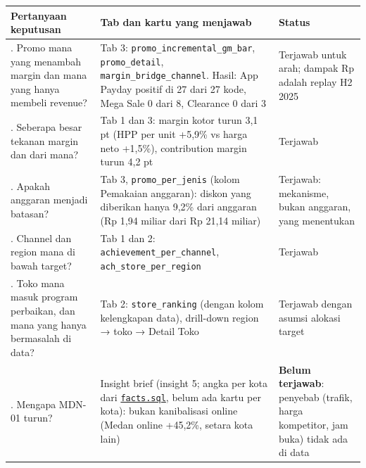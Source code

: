 \documentclass[10pt,a4paper]{article}
\begin{document}
{\def\LTcaptype{none} %
\begin{longtable}[]{@{}
  >{\raggedright\arraybackslash}p{}
  >{\raggedright\arraybackslash}p{}
  >{\raggedright\arraybackslash}p{}@{}}
\toprule\noalign{}
\begin{minipage}[b]{\linewidth}\raggedright
Pertanyaan keputusan
\end{minipage} & \begin{minipage}[b]{\linewidth}\raggedright
Tab dan kartu yang menjawab
\end{minipage} & \begin{minipage}[b]{\linewidth}\raggedright
Status
\end{minipage} \\
\midrule\noalign{}
\endhead
\bottomrule\noalign{}
\endlastfoot
1. Promo mana yang menambah margin dan mana yang hanya membeli revenue? & Tab 3: \texttt{promo\_\allowbreak{}incremental\_\allowbreak{}gm\_\allowbreak{}bar}, \texttt{promo\_\allowbreak{}detail}, \texttt{margin\_\allowbreak{}bridge\_\allowbreak{}channel}. Hasil: App Payday positif di 27 dari 27 kode, Mega Sale 0 dari 8, Clearance 0 dari 3 & Terjawab untuk arah; dampak Rp adalah replay H2 2025 \\
1. Seberapa besar tekanan margin dan dari mana? & Tab 1 dan 3: margin kotor turun 3,1 pt (HPP per unit +5,9\% vs harga neto +1,5\%), contribution margin turun 4,2 pt & Terjawab \\
1. Apakah anggaran menjadi batasan? & Tab 3, \texttt{promo\_\allowbreak{}per\_\allowbreak{}jenis} (kolom Pemakaian anggaran): diskon yang diberikan hanya 9,2\% dari anggaran (Rp 1,94 miliar dari Rp 21,14 miliar) & Terjawab: mekanisme, bukan anggaran, yang menentukan \\
2. Channel dan region mana di bawah target? & Tab 1 dan 2: \texttt{achievement\_\allowbreak{}per\_\allowbreak{}channel}, \texttt{ach\_\allowbreak{}store\_\allowbreak{}per\_\allowbreak{}region} & Terjawab \\
2. Toko mana masuk program perbaikan, dan mana yang hanya bermasalah di data? & Tab 2: \texttt{store\_\allowbreak{}ranking} (dengan kolom kelengkapan data), drill-down region → toko → Detail Toko & Terjawab dengan asumsi alokasi target \\
2. Mengapa MDN-01 turun? & Insight brief (insight 5; angka per kota dari \href{https://github.com/titan2903/kirana-omnichannel-performance-intelligence/blob/master/reports/insights/facts.sql}{\texttt{facts.sql}}, belum ada kartu per kota): bukan kanibalisasi online (Medan online +45,2\%, setara kota lain) & \textbf{Belum terjawab}: penyebab (trafik, harga kompetitor, jam buka) tidak ada di data \\
\end{longtable}
}
\end{document}
